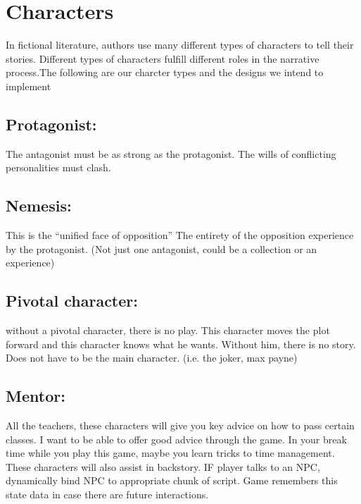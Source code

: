 \documentclass[11pt,fleqn]{book} %
\begin{document}
\section{Characters}

\vspace{1em}
In fictional literature, authors use many different types of characters to tell their stories. Different types of characters fulfill different roles in the narrative process.The following are our charcter types and the designs we intend to implement

\subsection{Protagonist:} The antagonist must be as strong as the protagonist. The wills of conflicting personalities must clash.\\
\subsection{Nemesis:} This is the “unified face of opposition” The entirety of the opposition experience by the protagonist. (Not just one antagonist, could be a collection or an experience)\\
\subsection{Pivotal character:} without a pivotal character, there is no play. This character moves the plot forward and this character knows what he wants. Without him, there is no story. Does not have to be the main character. (i.e. the joker, max payne)\\
\subsection{Mentor:} All the teachers, these characters will give you key advice on how to pass certain classes. I want to be able to offer good advice through the game. In your break time while you play this game, maybe you learn tricks to time management. These characters will also assist in backstory.
IF player talks to an NPC, dynamically bind NPC to appropriate chunk of script. Game remembers this state data in case there are future interactions.\\
\newpage
\end{document}
